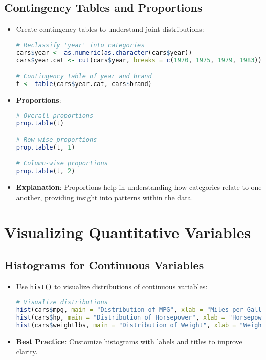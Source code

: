 \subsection{Contingency Tables and Proportions}
\begin{itemize}
    \item Create contingency tables to understand joint distributions:
\begin{lstlisting}[language=R]
# Reclassify 'year' into categories
cars$year <- as.numeric(as.character(cars$year))
cars$year.cat <- cut(cars$year, breaks = c(1970, 1975, 1979, 1983))

# Contingency table of year and brand
t <- table(cars$year.cat, cars$brand)
\end{lstlisting}

\item \textbf{Proportions}:
\begin{lstlisting}[language=R]
# Overall proportions
prop.table(t)

# Row-wise proportions
prop.table(t, 1)

# Column-wise proportions
prop.table(t, 2)
\end{lstlisting}
\item \textbf{Explanation}: Proportions help in understanding how categories relate to one another, providing insight into patterns within the data.
\end{itemize}

\section{Visualizing Quantitative Variables}
\subsection{Histograms for Continuous Variables}
\begin{itemize}
    \item Use \texttt{hist()} to visualize distributions of continuous variables:
\begin{lstlisting}[language=R]
# Visualize distributions
hist(cars$mpg, main = "Distribution of MPG", xlab = "Miles per Gallon")
hist(cars$hp, main = "Distribution of Horsepower", xlab = "Horsepower")
hist(cars$weightlbs, main = "Distribution of Weight", xlab = "Weight (lbs)")
\end{lstlisting}
    \item \textbf{Best Practice}: Customize histograms with labels and titles to improve clarity.
\end{itemize}

